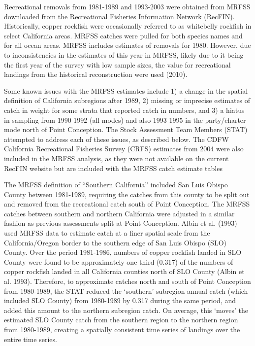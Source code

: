 \documentclass[11pt,
  english,
  letterpaper,
]{article}
\begin{document}
Recreational removals from 1981-1989 and 1993-2003 were obtained from MRFSS downloaded from the Recreational Fisheries Information Network (RecFIN). Historically, copper rockfish were occasionally referred to as whitebelly rockfish in select California areas. MRFSS catches were pulled for both species names and for all ocean areas. MRFSS includes estimates of removals for 1980. However, due to inconsistencies in the estimates of this year in MRFSS, likely due to it being the first year of the survey with low sample sizes, the value for recreational landings from the historical reconstruction were used (2010).

Some known issues with the MRFSS estimates include 1) a change in the spatial definition of California subregions after 1989, 2) missing or imprecise estimates of catch in weight for some strata that reported catch in numbers, and 3) a hiatus in sampling from 1990-1992 (all modes) and also 1993-1995 in the party/charter mode north of Point Conception. The Stock Assessment Team Members (STAT) attempted to address each of these issues, as described below. The CDFW California Recreational Fisheries Survey (CRFS) estimates from 2004 were also included in the MRFSS analysis, as they were not available on the current RecFIN website but are included with the MRFSS catch estimate tables

The MRFSS definition of ``Southern California'' included San Luis Obispo County between 1981-1989, requiring the catches from this county to be split out and removed from the recreational catch south of Point Conception. The MRFSS catches between southern and northern California were adjusted in a similar fashion as previous assessments split at Point Conception. Albin et al. (1993) used MRFSS data to estimate catch at a finer spatial scale from the California/Oregon border to the southern edge of San Luis Obispo (SLO) County. Over the period 1981-1986, numbers of copper rockfish landed in SLO County were found to be approximately one third (0.317) of the numbers of copper rockfish landed in all California counties north of SLO County (Albin et al. 1993). Therefore, to approximate catches north and south of Point Conception from 1980-1989, the STAT reduced the `southern' subregion annual catch (which included SLO County) from 1980-1989 by 0.317 during the same period, and added this amount to the northern subregion catch. On average, this `moves' the estimated SLO County catch from the southern region to the northern region from 1980-1989, creating a spatially consistent time series of landings over the entire time series.
\end{document}
